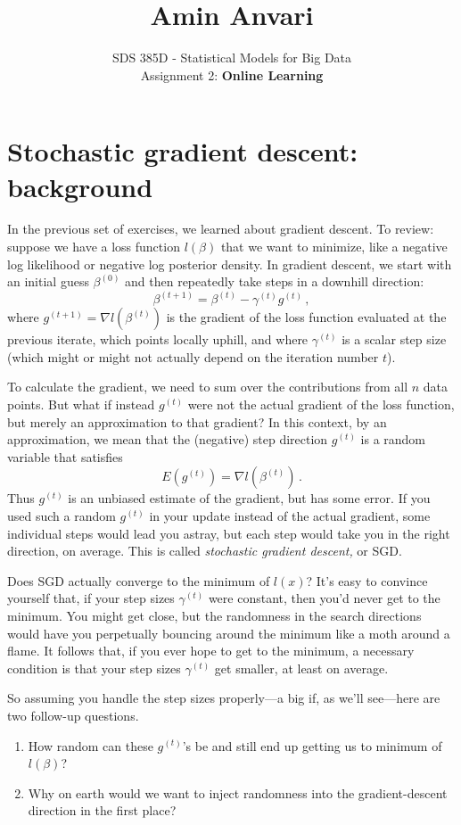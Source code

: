\documentclass{article}
\title{Amin Anvari}
\date{}
\author{SDS 385D - Statistical Models for Big Data\\ Assignment 2: \textbf{Online Learning}}
\date{}  %
\begin{document}
\maketitle%


\section{Stochastic gradient descent: background}

In the previous set of exercises, we learned about gradient descent.  To review: suppose we have a loss function $l(\beta)$ that we want to minimize, like a negative log likelihood or negative log posterior density.  In gradient descent, we start with an initial guess $\beta^{(0)}$ and then repeatedly take steps in a downhill direction:
$$
\beta^{(t+1)} = \beta^{(t)} - \gamma^{(t)} g^{(t)} \, ,
$$
where $g^{(t+1)}  = \nabla l(\beta^{(t)})$ is the gradient of the loss function evaluated at the previous iterate, which points locally uphill, and where $ \gamma^{(t)}$ is a scalar step size (which might or might not actually depend on the iteration number $t$).

To calculate the gradient, we need to sum over the contributions from all $n$ data points.  But what if instead $g^{(t)}$ were not the actual gradient of the loss function, but merely an approximation to that gradient?  In this context, by an approximation, we mean that the (negative) step direction $g^{(t)}$ is a random variable that satisfies
$$
E(g^{(t)}) = \nabla l(\beta^{(t)}) \, .
$$
Thus $g^{(t)}$ is an unbiased estimate of the gradient, but has some error.   If you used such a random $g^{(t)}$ in your update instead of the actual gradient, some individual steps would lead you astray, but each step would take you in the right direction, on average.  This is called \textit{stochastic gradient descent,} or SGD. 

Does SGD actually converge to the minimum of $l(x)$?  It's easy to convince yourself that, if your step sizes $\gamma^{(t)}$ were constant, then you'd never get to the minimum.  You might get close, but the randomness in the search directions would have you perpetually bouncing around the minimum like a moth around a flame.  It follows that, if you ever hope to get to the minimum, a necessary condition is that your step sizes $\gamma^{(t)}$ get smaller, at least on average.

So assuming you handle the step sizes properly---a big if, as we'll see---here are two follow-up questions.
\begin{enumerate}
\item How random can these $g^{(t)}$'s be and still end up getting us to minimum of $l(\beta)$? 
\item Why on earth would we want to inject randomness into the gradient-descent direction in the first place?
\end{enumerate}
\end{document}
